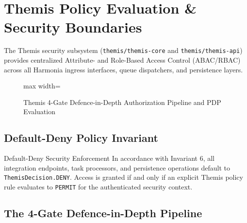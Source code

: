 
\chapter[Themis Policy Evaluation \& Security Boundaries]{Themis Policy Evaluation \&\\Security Boundaries}
\label{chap:themis_security}

The Themis security subsystem (\texttt{themis/themis-core} and \texttt{themis/themis-api}) provides centralized Attribute- and Role-Based Access Control (ABAC/RBAC) across all Harmonia ingress interfaces, queue dispatchers, and persistence layers.

\begin{figure}[htbp]
    \centering
    \begin{adjustbox}{max width=\textwidth}
        
    \end{adjustbox}
    \caption{Themis 4-Gate Defence-in-Depth Authorization Pipeline and PDP Evaluation}
    \label{fig:themis_security_pipeline}
\end{figure}

\section{Default-Deny Policy Invariant}

\begin{principlebox}{Default-Deny Security Enforcement}
In accordance with Invariant 6, all integration endpoints, task processors, and persistence operations default to \texttt{ThemisDecision.DENY}. Access is granted if and only if an explicit Themis policy rule evaluates to \texttt{PERMIT} for the authenticated security context.
\end{principlebox}

\section{The 4-Gate Defence-in-Depth Pipeline}

